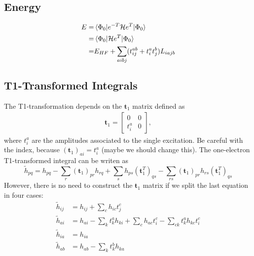 \subsection{Energy}
\hypertarget{sec:ccsd_energy}{}
\label{sec:ccsd_energy}

\begin{equation}
  \begin{split}
    E =& \mel{\Phi_0}{e^{-T}\ensuremath{\mathcal{H}}e^T}{\Phi_0}\\
    =& \mel{\Phi_0}{\ensuremath{\mathcal{H}}e^T}{\Phi_0}\\
    =& E_{HF} + \sum_{aibj}(t_{ij}^{ab} + t_i^at_j^b) L_{iajb}
  \end{split}
\end{equation}

\subsection{T1-Transformed Integrals}
\hypertarget{sec:ccsd_t1_trans}{}
\label{sec:ccsd_t1_trans}

The T1-transformation depends on the $\mathbf{t}_1$ matrix defined as
\begin{gather}
  \mathbf{t}_1=
  \begin{bmatrix}
    0     & 0\\
    t_i^a & 0
  \end{bmatrix},
\end{gather}
where $t_i^a$ are the amplitudes associated to the single excitation.
Be careful with the index, because $(\mathbf{t}_1)_{ai}=t_i^a$ (maybe we should change this).
The one-electron T1-transformed integral can be writen as
\begin{equation}
  {\tilde h}_{pq}=h_{pq}-\sum_r(\mathbf{t}_1)_{pr}h_{rq}+\sum_sh_{ps}(\mathbf{t}_1^T)_{qs}-\sum_{rs}(\mathbf{t}_1)_{pr}h_{rs}(\mathbf{t}_1^T)_{qs}
\end{equation}
However, there is no need to construct the $\mathbf{t}_1$ matrix if we split the last equation in four cases:
\begin{align}
  {\tilde h}_{ij}&=h_{ij}+\sum_ch_{ic}t_{j}^{c}\\
  {\tilde h}_{ai}&=h_{ai}-\sum_kt_{k}^{a}h_{ki}+\sum_ch_{ac}t_{i}^{c}-\sum_{ck}t_{k}^{a}h_{kc}t_{i}^{c}\\
  {\tilde h}_{ia}&=h_{ia}\\
  {\tilde h}_{ab}&=h_{ab}-\sum_kt_{k}^{b}h_{ka}
\end{align}

